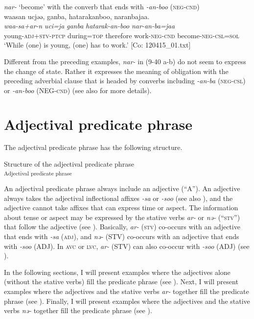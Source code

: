 \ex\textit{nar-} ‘become’ with the converb that ends with \textit{{}-an-boo} (\textsc{neg}-\textsc{cnd})\\
 \glll  waasan  ucjəə,  ganba,  hatarakanboo, naranbajaa.\\
    \textit{waa-sa+ar-n}  \textit{uci=ja}  \textit{ganba}  \textit{hatarak-an-boo}  \textit{nar-an-ba=jaa}\\
    young-\textsc{adj}+\textsc{stv}-\textsc{ptcp}  during=\textsc{top}  therefore  work-\textsc{neg}-\textsc{cnd}  become-\textsc{neg}-\textsc{csl}=\textsc{sol}\\
  \glt     ‘While (one) is young, (one) has to work.’ [Co: 120415\_01.txt]
  \z
\z

Different from the preceding examples, \textit{nar-} in (9-40 a-b) do not seem to express the change of state. Rather it expresses the meaning of obligation with the preceding adverbial clause that is headed by converbs including \textit{{}-an-ba} (\textsc{neg}-\textsc{csl}) or \textit{{}-an-boo} (NEG-\textsc{cnd}) (see also  for more details).

\section{Adjectival predicate phrase}\label{sec:9.2}

The adjectival predicate phrase has the following structure.

\ea   Structure of the adjectival predicate phrase \label{ex:9.41}\\\textsubscript{Adjectival predicate phrase}
\z

An adjectival predicate phrase always include an adjective (“A”). An adjective always takes the adjectival inflectional affixes \textit{{}-sa} or \textit{{}-soo} (see also ), and the adjective cannot take affixes that can express time or aspect. The information about tense or aspect may be expressed by the stative verbs \textit{ar-} or \textit{nə-} (“\textsc{stv}”) that follow the adjective (see ). Basically, \textit{ar-} (\textsc{stv}) co-occurs with an adjective that ends with \textit{{}-sa} (\textsc{adj}), and \textit{nə-} (STV) co-occurs with an adjective that ends with \textit{{}-soo} (ADJ). In \textsc{avc} or \textsc{lvc}, \textit{ar-} (STV) can also co-occur with \textit{{}-soo} (ADJ) (see ).

  In the following sections, I will present examples where the adjectives alone (without the stative verbs) fill the predicate phrase (see ). Next, I will present examples where the adjectives and the stative verbs \textit{ar-} together fill the predicate phrase (see ). Finally, I will present examples where the adjectives and the stative verbs \textit{nə-} together fill the predicate phrase (see ).

